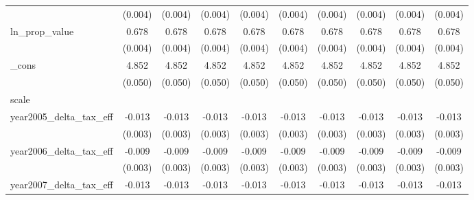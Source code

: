 {\begin{tabular}{l*{9}{c}}
            &     (0.004)         &     (0.004)         &     (0.004)         &     (0.004)         &     (0.004)         &     (0.004)         &     (0.004)         &     (0.004)         &     (0.004)         \\
[1em]
ln_prop_value&       0.678\sym{***}&       0.678\sym{***}&       0.678\sym{***}&       0.678\sym{***}&       0.678\sym{***}&       0.678\sym{***}&       0.678\sym{***}&       0.678\sym{***}&       0.678\sym{***}\\
            &     (0.004)         &     (0.004)         &     (0.004)         &     (0.004)         &     (0.004)         &     (0.004)         &     (0.004)         &     (0.004)         &     (0.004)         \\
[1em]
_cons       &       4.852\sym{***}&       4.852\sym{***}&       4.852\sym{***}&       4.852\sym{***}&       4.852\sym{***}&       4.852\sym{***}&       4.852\sym{***}&       4.852\sym{***}&       4.852\sym{***}\\
            &     (0.050)         &     (0.050)         &     (0.050)         &     (0.050)         &     (0.050)         &     (0.050)         &     (0.050)         &     (0.050)         &     (0.050)         \\
\hline
scale       &                     &                     &                     &                     &                     &                     &                     &                     &                     \\
year2005_delta_tax_eff&      -0.013\sym{***}&      -0.013\sym{***}&      -0.013\sym{***}&      -0.013\sym{***}&      -0.013\sym{***}&      -0.013\sym{***}&      -0.013\sym{***}&      -0.013\sym{***}&      -0.013\sym{***}\\
            &     (0.003)         &     (0.003)         &     (0.003)         &     (0.003)         &     (0.003)         &     (0.003)         &     (0.003)         &     (0.003)         &     (0.003)         \\
[1em]
year2006_delta_tax_eff&      -0.009\sym{***}&      -0.009\sym{***}&      -0.009\sym{***}&      -0.009\sym{***}&      -0.009\sym{***}&      -0.009\sym{***}&      -0.009\sym{***}&      -0.009\sym{***}&      -0.009\sym{***}\\
            &     (0.003)         &     (0.003)         &     (0.003)         &     (0.003)         &     (0.003)         &     (0.003)         &     (0.003)         &     (0.003)         &     (0.003)         \\
[1em]
year2007_delta_tax_eff&      -0.013\sym{***}&      -0.013\sym{***}&      -0.013\sym{***}&      -0.013\sym{***}&      -0.013\sym{***}&      -0.013\sym{***}&      -0.013\sym{***}&      -0.013\sym{***}&      -0.013\sym{***}\\

\end{tabular}}
